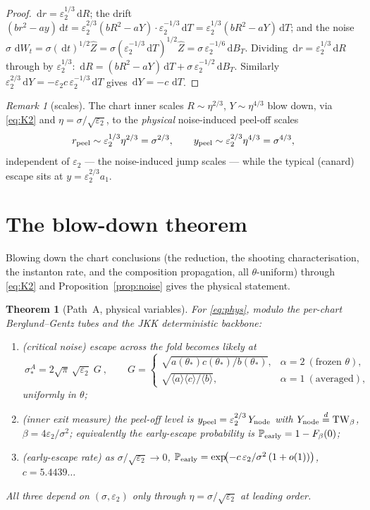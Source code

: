 \documentclass[11pt]{article}
\newtheorem{theorem}{Theorem}
\theoremstyle{remark}
\newtheorem*{remark}{Remark}
\newcommand{\dd}{\,\mathrm{d}}
\newcommand{\TW}{\mathrm{TW}}
\newcommand{\eqd}{\stackrel{d}{=}}
\newcommand{\ep}{\varepsilon}
\begin{document}
\begin{proof}
$\dd r=\ep_2^{1/3}\dd R$; the drift $(br^2-ay)\dd t=\ep_2^{2/3}(bR^2-aY)\cdot
\ep_2^{-1/3}\dd T=\ep_2^{1/3}(bR^2-aY)\dd T$; and the noise
$\sigma\,\dd W_t=\sigma(\dd t)^{1/2}\hat Z=\sigma(\ep_2^{-1/3}\dd T)^{1/2}\hat
Z=\sigma\,\ep_2^{-1/6}\dd B_T$. Dividing $\dd r=\ep_2^{1/3}\dd R$ through by $\ep_2^{1/3}$:
$\dd R=(bR^2-aY)\dd T+\sigma\,\ep_2^{-1/2}\dd B_T$. Similarly $\ep_2^{2/3}\dd Y=-\ep_2
c\,\ep_2^{-1/3}\dd T$ gives $\dd Y=-c\,\dd T$.
\end{proof}

\begin{remark}[scales]
The chart inner scales $R\sim\eta^{2/3}$, $Y\sim\eta^{4/3}$ blow down, via \eqref{eq:K2}
and $\eta=\sigma/\sqrt{\ep_2}$, to the \emph{physical} noise-induced peel-off scales
\[
  r_{\rm peel}\sim\ep_2^{1/3}\eta^{2/3}=\sigma^{2/3},\qquad
  y_{\rm peel}\sim\ep_2^{2/3}\eta^{4/3}=\sigma^{4/3},
\]
independent of $\ep_2$ --- the noise-induced jump scales --- while the typical (canard)
escape sits at $y=\ep_2^{2/3}a_1$.
\end{remark}

\section{The blow-down theorem}

Blowing down the chart conclusions (the reduction, the shooting characterisation, the
instanton rate, and the composition propagation, all $\theta$-uniform) through
\eqref{eq:K2} and Proposition~\ref{prop:noise} gives the physical statement.

\begin{theorem}[Path~A, physical variables]\label{thm:main}
For \eqref{eq:phys}, modulo the per-chart Berglund--Gentz tubes and the JKK deterministic
backbone:
\begin{enumerate}
\item[\textup{(i)}] \textup{(critical noise)} escape across the fold becomes likely at
\[
  \boxed{\ \sigma_*^A=2\sqrt\pi\,\sqrt{\ep_2}\;G\ },\qquad
  G=\begin{cases}\sqrt{a(\theta_*)c(\theta_*)/b(\theta_*)}, & \alpha=2\ (\text{frozen }\theta),\\[2pt]
     \sqrt{\langle a\rangle\langle c\rangle/\langle b\rangle}, & \alpha=1\ (\text{averaged}),\end{cases}
\]
uniformly in $\theta$;
\item[\textup{(ii)}] \textup{(inner exit measure)} the peel-off level is
$y_{\rm peel}=\ep_2^{2/3}\,Y_{\rm node}$ with $Y_{\rm node}\eqd\TW_\beta$,
$\beta=4\ep_2/\sigma^2$; equivalently the early-escape probability is
$\mathbb P_{\rm early}=1-F_{\beta}(0)$;
\item[\textup{(iii)}] \textup{(early-escape rate)} as $\sigma/\sqrt{\ep_2}\to0$,
$\mathbb P_{\rm early}=\exp\!\bigl(-c\,\ep_2/\sigma^2\,(1+o(1))\bigr)$, $c=5.4439\ldots$
\end{enumerate}
All three depend on $(\sigma,\ep_2)$ only through $\eta=\sigma/\sqrt{\ep_2}$ at leading
order.
\end{theorem}
\end{document}
